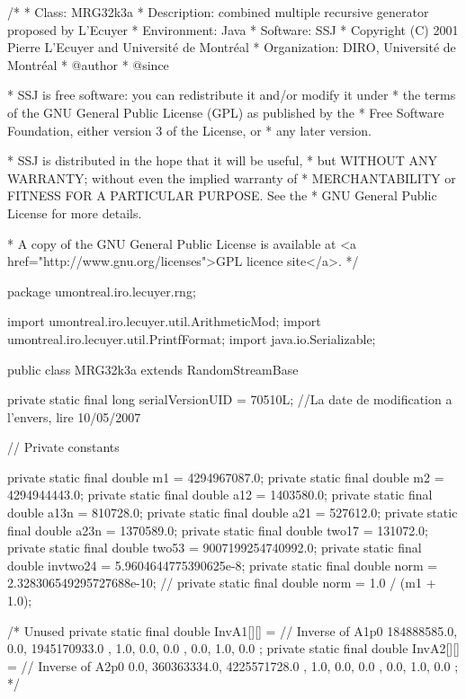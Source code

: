 \begin{code}
\begin{hide}
/*
 * Class:        MRG32k3a
 * Description:  combined multiple recursive generator proposed by L'Ecuyer
 * Environment:  Java
 * Software:     SSJ 
 * Copyright (C) 2001  Pierre L'Ecuyer and Université de Montréal
 * Organization: DIRO, Université de Montréal
 * @author       
 * @since

 * SSJ is free software: you can redistribute it and/or modify it under
 * the terms of the GNU General Public License (GPL) as published by the
 * Free Software Foundation, either version 3 of the License, or
 * any later version.

 * SSJ is distributed in the hope that it will be useful,
 * but WITHOUT ANY WARRANTY; without even the implied warranty of
 * MERCHANTABILITY or FITNESS FOR A PARTICULAR PURPOSE.  See the
 * GNU General Public License for more details.

 * A copy of the GNU General Public License is available at
   <a href="http://www.gnu.org/licenses">GPL licence site</a>.
 */
\end{hide}
package umontreal.iro.lecuyer.rng; \begin{hide}

import umontreal.iro.lecuyer.util.ArithmeticMod;
import umontreal.iro.lecuyer.util.PrintfFormat;
import java.io.Serializable;
\end{hide}

public class MRG32k3a extends RandomStreamBase \begin{hide} {

   private static final long serialVersionUID = 70510L;
   //La date de modification a l'envers, lire 10/05/2007

   // Private constants   %

   private static final double m1     = 4294967087.0;
   private static final double m2     = 4294944443.0;
   private static final double a12    =  1403580.0;
   private static final double a13n   =   810728.0;
   private static final double a21    =   527612.0;
   private static final double a23n   =  1370589.0;
   private static final double two17    =  131072.0;
   private static final double two53    =  9007199254740992.0;
   private static final double invtwo24 = 5.9604644775390625e-8;
   private static final double norm   = 2.328306549295727688e-10;
   //    private static final double norm   = 1.0 / (m1 + 1.0);


   /*  Unused
   private static final double InvA1[][] = {   // Inverse of A1p0
     { 184888585.0, 0.0, 1945170933.0 },
     {         1.0, 0.0,          0.0 },
     {         0.0, 1.0,          0.0 }
     };
   private static final double InvA2[][] = {   // Inverse of A2p0
     { 0.0, 360363334.0, 4225571728.0 },
     { 1.0,         0.0,          0.0 },
     { 0.0,         1.0,          0.0 }
     };
   */

}
\end{hide}
\end{code}
